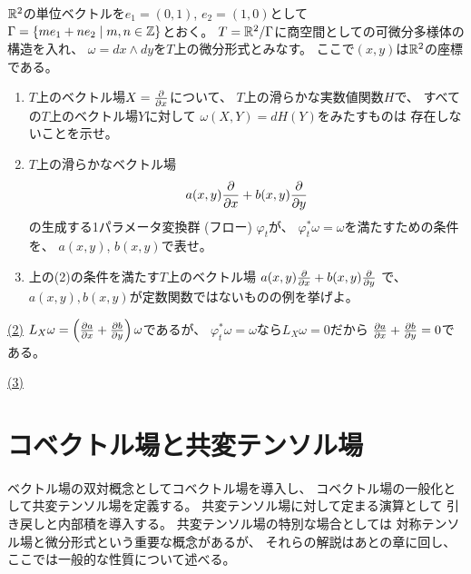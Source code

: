 \documentclass[report]{jlreq}
\begin{document}
\begin{problem}[東大数理 2006B]
    $\mathbb{R}^2$の単位ベクトルを$e_1 = (0, 1)$, $e_2 = (1, 0)$として
    $\Gamma = \{m e_1 + n e_2 \mid m,n \in \mathbb{Z}\}$とおく。
    $T = \mathbb{R}^2/\Gamma$に商空間としての可微分多様体の構造を入れ、
    $\omega = dx \wedge dy$を$T$上の微分形式とみなす。
    ここで$(x, y)$は$\mathbb{R}^2$の座標である。
    \begin{enumerate}
        \item $T$上のベクトル場$X = \deldel{x}$について、
            $T$上の滑らかな実数値関数$H$で、
            すべての$T$上のベクトル場$Y$に対して
            $\omega(X, Y) = dH(Y)$をみたすものは
            存在しないことを示せ。
        \item $T$上の滑らかなベクトル場
            \begin{equation}
                a(x, y) \deldel{x}
                    + b(x, y) \deldel{y}
            \end{equation}
            の生成する1パラメータ変換群 (フロー) $\varphi_t$が、
            $\varphi_t^* \omega = \omega$を満たすための条件を、
            $a(x,y)$, $b(x,y)$で表せ。
        \item 上の(2)の条件を満たす$T$上のベクトル場
            $a(x, y) \deldel{x} + b(x, y) \deldel{y}$
            で、$a(x, y), b(x, y)$が定数関数ではないものの例を挙げよ。
    \end{enumerate}
\end{problem}

\begin{answer}
    \uline{(2)} \quad
    $L_X \omega = \myparen{\deldel[a]{x} + \deldel[b]{y}} \omega$であるが、
    $\varphi_t^* \omega = \omega$なら$L_X \omega = 0$だから
    $\deldel[a]{x} + \deldel[b]{y} = 0$である。
    \TODO{}

    \uline{(3)} \quad
    \TODO{}
\end{answer}



%
\newpage
\chapter{コベクトル場と共変テンソル場}

ベクトル場の双対概念としてコベクトル場を導入し、
コベクトル場の一般化として共変テンソル場を定義する。
共変テンソル場に対して定まる演算として
引き戻しと内部積を導入する。
共変テンソル場の特別な場合としては
対称テンソル場と微分形式という重要な概念があるが、
それらの解説はあとの章に回し、ここでは一般的な性質について述べる。
\end{document}
